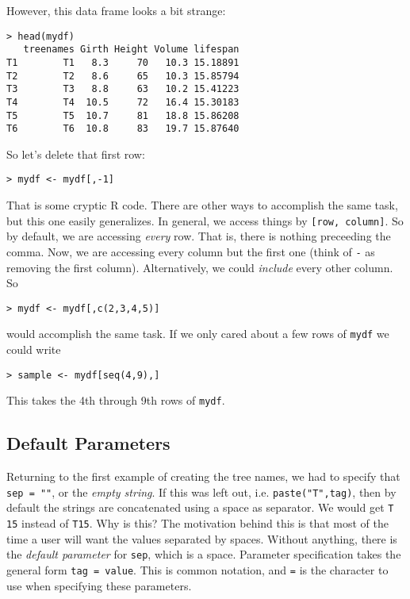 \documentclass[12pt]{article}
\newtheorem{exercise}{Exercise}
\begin{document}
However, this data frame looks a bit strange:
\begin{verbatim}
> head(mydf)
   treenames Girth Height Volume lifespan
T1        T1   8.3     70   10.3 15.18891
T2        T2   8.6     65   10.3 15.85794
T3        T3   8.8     63   10.2 15.41223
T4        T4  10.5     72   16.4 15.30183
T5        T5  10.7     81   18.8 15.86208
T6        T6  10.8     83   19.7 15.87640
\end{verbatim}
So let's delete that first row:
\begin{verbatim}
> mydf <- mydf[,-1]
\end{verbatim}

That is some cryptic R code. There are other ways to accomplish the same task, but this one easily generalizes. In general, we access things by \verb|[row, column]|. So by default, we are accessing \emph{every} row. That is, there is nothing preceeding the comma. Now, we are accessing every column but the first one (think of \verb|-| as removing the first column). Alternatively, we could \emph{include} every other column. So
\begin{verbatim}
> mydf <- mydf[,c(2,3,4,5)]
\end{verbatim}
would accomplish the same task. If we only cared about a few rows of \verb|mydf| we could write
\begin{verbatim}
> sample <- mydf[seq(4,9),]
\end{verbatim}
This takes the 4th through 9th rows of \verb|mydf|.



\subsection{Default Parameters}

Returning to the first example of creating the tree names, we had to specify that \verb|sep = ""|, or the \emph{empty string}. If this was left out, i.e. \verb|paste("T",tag)|, then by default the strings are concatenated using a space as separator. We would get \verb|T 15| instead of \verb|T15|. Why is this? The motivation behind this is that most of the time a user will want the values separated by spaces. Without anything, there is the \emph{default parameter} for \verb|sep|, which is a space. Parameter specification takes the general form \verb|tag = value|. This is common notation, and \verb|=| is the character to use when specifying these parameters.
\end{document}
